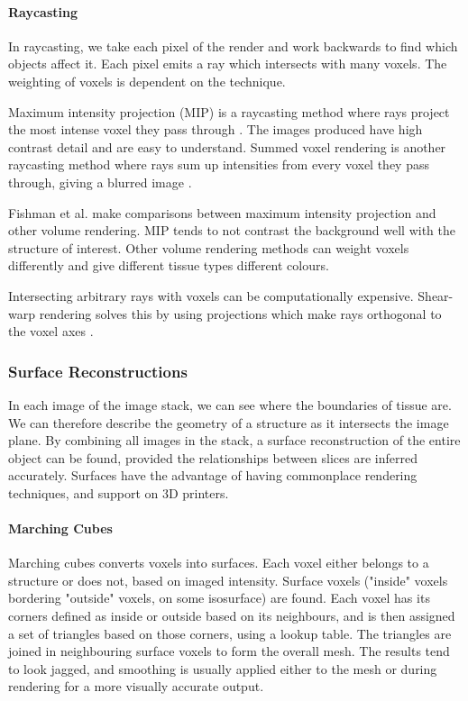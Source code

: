 \documentclass[11p, titlepage]{article}
\begin{document}
\paragraph{Raycasting}

In raycasting, we take each pixel of the render and work backwards to find which objects affect it. Each pixel emits a ray which intersects with many voxels. The weighting of voxels is dependent on the technique.

Maximum intensity projection (MIP) is a raycasting method where rays project the most intense voxel they pass through \cite{birkfellner2016applied}. The images produced have high contrast detail and are easy to understand. Summed voxel rendering is another raycasting method where rays sum up intensities from every voxel they pass through, giving a blurred image \cite{birkfellner2016applied}.

Fishman et al. \cite{fishman2006volume} make comparisons between maximum intensity projection and other volume rendering. MIP tends to not contrast the background well with the structure of interest. Other volume rendering methods can weight voxels differently and give different tissue types different colours. 

Intersecting arbitrary rays with voxels can be computationally expensive. Shear-warp rendering solves this by using projections which make rays orthogonal to the voxel axes \cite{lacroute1994fast}. 

\subsubsection{Surface Reconstructions}

In each image of the image stack, we can see where the boundaries of tissue are. We can therefore describe the geometry of a structure as it intersects the image plane. By combining all images in the stack, a surface reconstruction of the entire object can be found, provided the relationships between slices are inferred accurately. Surfaces have the advantage of having commonplace rendering techniques, and support on 3D printers.

\paragraph{Marching Cubes}

Marching cubes \cite{lorensen1987marching} converts voxels into surfaces. Each voxel either belongs to a structure or does not, based on imaged intensity. Surface voxels ("inside" voxels bordering "outside" voxels, on some isosurface) are found. Each voxel has its corners defined as inside or outside based on its neighbours, and is then assigned a set of triangles based on those corners, using a lookup table. The triangles are joined in neighbouring surface voxels to form the overall mesh. The results tend to look jagged, and smoothing is usually applied either to the mesh or during rendering for a more visually accurate output.
\end{document}
